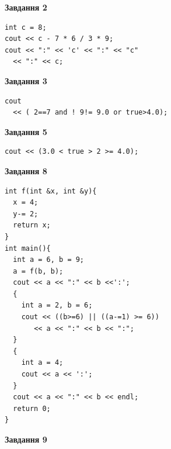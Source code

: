 \documentclass[12pt, ukrainian]{article}
\begin{document}
{\begin {large}
\begin{minipage}[t]{7.0cm}
\end{minipage}
\vline \hspace{1mm}
\begin{minipage}[t]{11.0cm}

\begin{center}
\textbf{Завдання 2}
\end{center}
\vspace{-8mm}

\begin{verbatim}
int c = 8;
cout << c - 7 * 6 / 3 * 9;
cout << ":" << 'c' << ":" << "c" 
  << ":" << c;
\end{verbatim}



\begin{center}
\textbf{Завдання 3}
\end{center}
\vspace{-8mm}

\begin{verbatim}
cout 
  << ( 2==7 and ! 9!= 9.0 or true>4.0);
\end{verbatim}



\begin{center}
\textbf{Завдання 5}
\end{center}
\vspace{-8mm}

\begin{verbatim}
cout << (3.0 < true > 2 >= 4.0);
\end{verbatim}



\begin{center}
\textbf{Завдання 8}
\end{center}
\vspace{-8mm}

\begin{verbatim}
int f(int &x, int &y){
  x = 4;
  y-= 2;
  return x;
}
int main(){
  int a = 6, b = 9;
  a = f(b, b);
  cout << a << ":" << b <<':';
  {
    int a = 2, b = 6;
    cout << ((b>=6) || ((a-=1) >= 6))
       << a << ":" << b << ":";
  }
  {
    int a = 4;
    cout << a << ':';
  }
  cout << a << ":" << b << endl;
  return 0;
}
\end{verbatim}

\end{minipage}


\begin{minipage}[t]{7.0cm}

\begin{center}
\textbf{Завдання 9}
\end{center}
\vspace{-8mm}


\end{minipage}
\end{large}}
\end{document}
